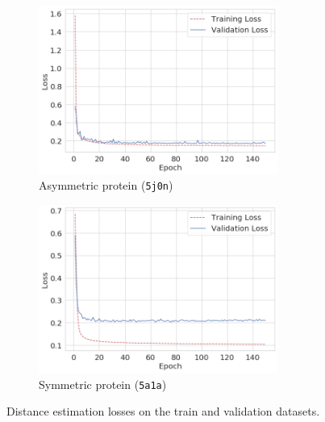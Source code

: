 \begin{figure}[ht!]
    \centering
    \begin{subfigure}[t]{0.45\textwidth}
        \includegraphics[height=5.5cm]{images/de_5j0n.png}
        \caption{Asymmetric protein (\texttt{5j0n})}
        \label{fig:losses-siamese-assym}
    \end{subfigure} \quad \quad
    \begin{subfigure}[t]{0.5\textwidth}
        \includegraphics[height=5.5cm]{images/de_5a1a.png}
        \caption{Symmetric protein (\texttt{5a1a})}
        \label{fig:losses-siamese-sym}
    \end{subfigure}
    \caption{Distance estimation losses on the train and validation datasets.}
    \label{fig:losses-siamese}
\end{figure}

